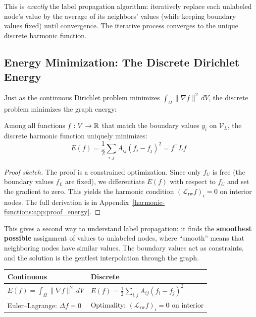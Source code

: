 \begin{notechapter}
This is \emph{exactly} the label propagation algorithm: iteratively replace
each unlabeled node's value by the average of its neighbors' values (while
keeping boundary values fixed) until convergence. The iterative process
converges to the unique discrete harmonic function.

\subsection{Energy Minimization: The Discrete Dirichlet Energy}

Just as the continuous Dirichlet problem minimizes
$\int_\Omega \|\nabla f\|^2\,dV$, the discrete problem minimizes the graph
energy:

\begin{proposition}
\label{harmonic-functions:prop:energy_min}
Among all functions $f : V \to \mathbb{R}$ that match the boundary values $y_i$
on $\mathcal{V}_L$, the discrete harmonic function uniquely minimizes:
\begin{equation}
E(f) = \frac{1}{2}\sum_{i,j} A_{ij}(f_i - f_j)^2 = f^\top L f
\end{equation}
\end{proposition}

\begin{proof}[Proof sketch]
The proof is a constrained optimization. Since only $f_U$ is free (the
boundary values $f_L$ are fixed), we differentiate $E(f)$ with respect to
$f_U$ and set the gradient to zero. This yields the harmonic condition
$(\mathcal{L}_{\mathrm{rw}} f)_i = 0$ on interior nodes. The full
derivation is in Appendix~\ref{harmonic-functions:app:proof_energy}.
\end{proof}

This gives a second way to understand label propagation: it finds the
\textbf{smoothest possible} assignment of values to unlabeled nodes, where
``smooth'' means that neighboring nodes have similar values. The boundary
values act as constraints, and the solution is the gentlest interpolation
through the graph.

\begin{center}
\begin{tabular}{ll}
\toprule
\textbf{Continuous} & \textbf{Discrete} \\
\midrule
$\displaystyle E(f) = \int_\Omega \|\nabla f\|^2\,dV$ &
$\displaystyle E(f) = \frac{1}{2}\sum_{i,j} A_{ij}(f_i - f_j)^2$ \\[6pt]
Euler--Lagrange: $\Delta f = 0$ &
Optimality: $(\mathcal{L}_{\mathrm{rw}} f)_i = 0$ on interior \\
\bottomrule
\end{tabular}
\end{center}



\end{notechapter}
